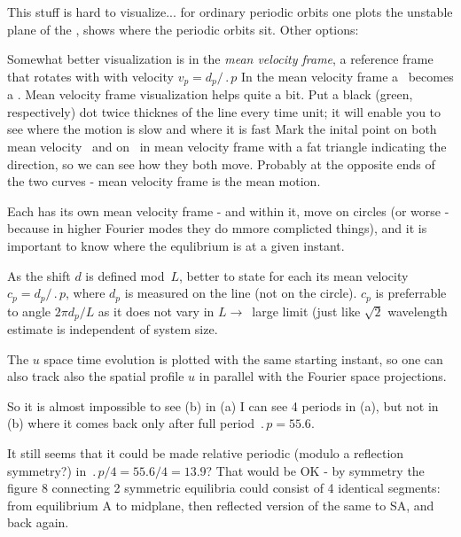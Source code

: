 This stuff is hard to visualize... for ordinary periodic orbits one
plots the unstable plane of the \eqv, shows where the periodic
orbits sit. Other options:

Somewhat better visualization is in the
{\em mean velocity frame}, {\ie} 
a reference frame that rotates with with velocity 
$v_p=d_p/\period{p}$
In the mean velocity frame a \rpo\ becomes
a \po.
Mean velocity frame visualization helps quite a bit.
Put a black (green, respectively) dot
twice thicknes of the line every time unit; it will enable you to see
where the motion is slow and where it is fast
Mark the inital point on both
mean velocity \rpo\ and on \eqv\  in mean velocity
 frame with a fat triangle
indicating the direction, so we can see how they both move. Probably at the
opposite ends of the two curves - mean velocity frame is the mean motion.


Each {\rpo} has its own mean velocity frame - and within it, {\eqv}
move on circles (or worse - because in higher Fourier modes they do mmore
complicted things), and it is important to know where the equlibrium is at
a given instant.

As the shift $d$ is defined mod~$L$, better to
state for each {\rpo} its mean velocity $c_p = d_p/\period{p}$,
where $d_p$ is measured on the line (not on the circle). $c_p$ is
preferrable to angle $2\pi d_p/L$ as it does not vary in $L \to$~large 
limit (just like $\sqrt{2}$ wavelength estimate is independent of
system size.




The $u$ space time evolution  %
is plotted with the same starting instant,
so one can also track also the spatial profile $u$ in parallel with
the Fourier space projections.

So it is almost impossible to see (b) %
in (a) %
I can see 4 periods in (a), %
but not in (b) %
where it comes back only after full period $\period{p}=55.6$.

It still seems that it could be made relative periodic 
(modulo a reflection symmetry?)
in $\period{p}/4=55.6/4=13.9$? That would be OK 
-
by symmetry the figure 8 connecting
2 symmetric equilibria could consist of 4 identical segments: from
equilibrium A to midplane, then reflected version of the same to SA, and
back again.

